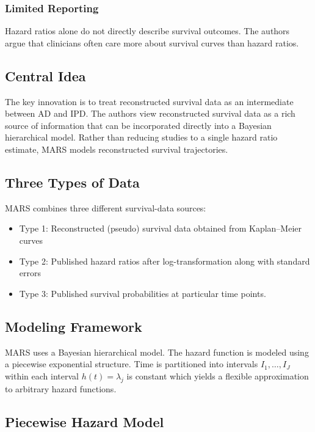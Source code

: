 \documentclass[11pt]{article}
\begin{document}
\subsubsection*{Limited Reporting}

Hazard ratios alone do not directly describe survival outcomes. The authors argue that clinicians often care more about survival curves than hazard ratios.

\subsection*{Central Idea}

The key innovation is to treat reconstructed survival data as an intermediate between AD and IPD. The authors view reconstructed survival data as a rich source of information that can be incorporated directly into a Bayesian hierarchical model.
Rather than reducing studies to a single hazard ratio estimate, MARS models reconstructed survival trajectories.

\subsection*{Three Types of Data}

MARS combines three different survival-data sources:
\begin{itemize}
    \item Type 1: Reconstructed (pseudo) survival data obtained from Kaplan--Meier curves
    \item Type 2: Published hazard ratios after log-transformation along with standard errors
    \item Type 3: Published survival probabilities at particular time points.
\end{itemize}

\subsection*{Modeling Framework}

MARS uses a Bayesian hierarchical model. The hazard function is modeled using a piecewise exponential structure. Time is partitioned into intervals $I_1,\ldots,I_J$ within each interval $h(t)=\lambda_j$ is constant which yields a flexible approximation to arbitrary hazard functions.

\subsection*{Piecewise Hazard Model}
\end{document}
